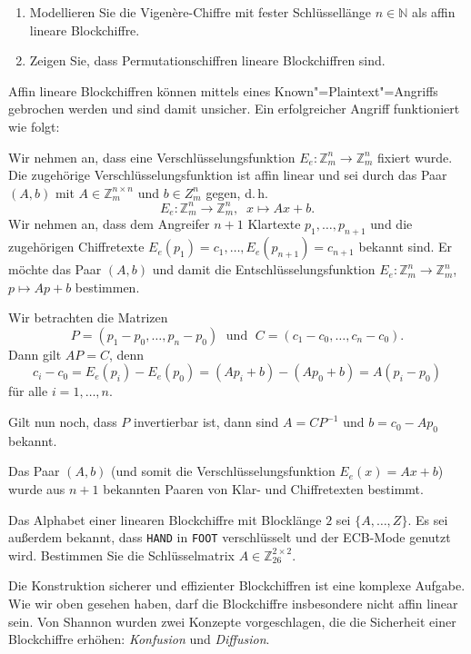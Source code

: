 \begin{exercise}
\begin{enumerate}
 \item Modellieren Sie die Vigenère-Chiffre mit fester Schlüssellänge $n \in ℕ$ als affin lineare Blockchiffre. 
 \item Zeigen Sie, dass Permutationschiffren lineare Blockchiffren sind.
 \end{enumerate}
\end{exercise}

\begin{construction}
Affin lineare Blockchiffren können mittels eines Known"=Plaintext"=Angriffs gebrochen werden und sind damit unsicher. Ein erfolgreicher Angriff funktioniert wie folgt:

Wir nehmen an, dass eine Verschlüsselungsfunktion $E_e: ℤ_m^n → ℤ_m^n$ fixiert wurde. Die zugehörige Verschlüsselungsfunktion ist affin linear und sei durch das Paar $(A, b)$ mit $A \in ℤ_m^{n \times n}$ und $b \in Z_m^n$ gegen, d.\,h.
\[E_e: ℤ_m^n → ℤ_m^n, \; \; x ↦ Ax + b.\]
Wir nehmen an, dass dem Angreifer $n+1$ Klartexte $p_1, \dots, p_{n+1}$ und die zugehörigen Chiffretexte $E_e(p_1) = c_1, \dots, E_e(p_{n+1}) =  c_{n+1}$ bekannt sind. Er möchte das Paar $(A, b)$ und damit die Entschlüsselungsfunktion $E_e: ℤ_m^n → ℤ_m^n$, $p ↦ Ap + b$ bestimmen. 

Wir betrachten die Matrizen
\[P = (p_1 - p_0, \dotsc, p_n - p_0) \; \text{ und } \; C = (c_1 - c_0, \dotsc, c_n - c_0).\]
Dann gilt $AP = C$, denn
\[c_i -c_0 = E_e(p_i) - E_e(p_0) = (Ap_i + b) - (Ap_0 + b) = A(p_i - p_0)\]
für alle $i = 1, \dotsc, n$.

Gilt nun noch, dass $P$ invertierbar ist, dann sind $A = CP^{-1}$ und $b = c_0 - Ap_0$ bekannt. 

Das Paar $(A, b)$ (und somit die Verschlüsselungsfunktion $E_e(x) = Ax + b$) wurde aus $n+1$ bekannten Paaren von Klar- und Chiffretexten bestimmt.
\end{construction}

\begin{exercise}
 Das Alphabet einer linearen Blockchiffre mit Blocklänge $2$ sei $\{A, \dotsc, Z\}$. Es sei außerdem bekannt, dass \texttt{HAND} in \texttt{FOOT} verschlüsselt und der ECB-Mode genutzt wird. Bestimmen Sie die Schlüsselmatrix $A \in ℤ_{26}^{2 \times 2}$.
\end{exercise}

Die Konstruktion sicherer und effizienter Blockchiffren ist eine komplexe Aufgabe. Wie wir oben gesehen haben, darf die Blockchiffre insbesondere nicht affin linear sein. Von Shannon wurden zwei Konzepte vorgeschlagen, die die Sicherheit einer Blockchiffre erhöhen: \emph{Konfusion} und \emph{Diffusion}.

